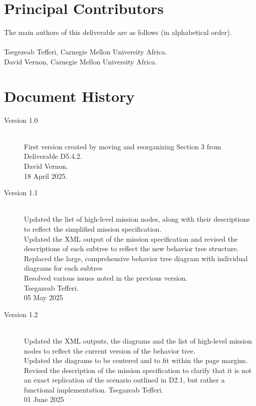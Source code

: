 \documentclass{CSSRforAfrica}
\newcommand{\blank}{~\\}
\begin{document}
 

\pagebreak
\section*{Principal Contributors}
\label{contributors}
The main authors of this deliverable are as follows (in alphabetical order).
\blank
~
\blank
Tsegezeab Tefferi, Carnegie Mellon University Africa.\\   
David Vernon, Carnegie Mellon University Africa.\\   
  

\newpage
\section*{Document History}
\label{document_history}

\begin{description}

\item [Version 1.0]~\\
First version created by moving and reorganizing Section 3 from Deliverable D5.4.2. \\
David Vernon.\\
18 April 2025.   \\               

\item [Version 1.1]~\\
Updated the list of high-level mission nodes, along with their descriptions to reflect the simplified mission specification.\\
Updated the XML output of the mission specification and revised the descriptions of each subtree to reflect the new behavior tree structure.\\
Replaced the large, comprehensive behavior tree diagram with individual diagrams for each subtree\\
Resolved various issues noted in the previous version.\\
Tsegazeab Tefferi.\\
05 May 2025

\item [Version 1.2]~\\
Updated the XML outputs, the diagrams and the list of high-level mission nodes to reflect the current version of the behavior tree.\\
Updated the diagrams to be centered and to fit within the page margins.\\
Revised the description of the mission specification to clarify that it is not an exact replication of the scenario outlined in D2.1, but rather a functional implementation.
Tsegazeab Tefferi.\\
01 June 2025

\end{description}
\end{document}

